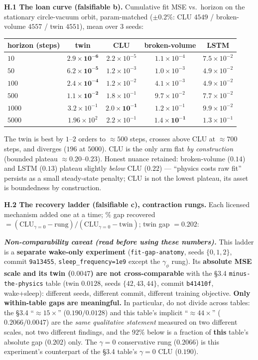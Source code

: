 \documentclass[10pt]{article}
\begin{document}
\textbf{H.1 The loan curve (falsifiable b).} Cumulative fit MSE vs.\ horizon on the stationary circle-vacuum orbit, param-matched ($\pm0.2\%$: CLU $4549$ / broken-volume $4557$ / twin $4551$), mean over $3$ seeds:
\begin{center}\small
\begin{tabular}{lcccc}
\toprule
horizon (steps) & \textbf{twin} & \textbf{CLU} & broken-volume & LSTM \\
\midrule
$10$ & $\mathbf{2.9{\times}10^{-6}}$ & $2.2{\times}10^{-5}$ & $1.1{\times}10^{-4}$ & $7.5{\times}10^{-2}$ \\
$50$ & $\mathbf{6.2{\times}10^{-5}}$ & $1.2{\times}10^{-3}$ & $1.0{\times}10^{-3}$ & $4.9{\times}10^{-2}$ \\
$100$ & $\mathbf{2.4{\times}10^{-4}}$ & $1.2{\times}10^{-2}$ & $4.1{\times}10^{-3}$ & $4.9{\times}10^{-2}$ \\
$500$ & $\mathbf{1.1{\times}10^{-2}}$ & $1.8{\times}10^{-1}$ & $9.7{\times}10^{-2}$ & $7.7{\times}10^{-2}$ \\
$1000$ & $3.2{\times}10^{-1}$ & $\mathbf{2.0{\times}10^{-1}}$ & $1.2{\times}10^{-1}$ & $9.9{\times}10^{-2}$ \\
$5000$ & $1.96{\times}10^{2}$ & $2.2{\times}10^{-1}$ & $\mathbf{1.4{\times}10^{-1}}$ & $1.3{\times}10^{-1}$ \\
\bottomrule
\end{tabular}
\end{center}
The twin is best by $1$--$2$ orders to $\approx500$ steps, crosses above CLU at $\approx700$ steps, and diverges ($196$ at $5000$). CLU is the only arm flat \emph{by construction} (bounded plateau $\approx0.20$--$0.23$). Honest nuance retained: broken-volume ($0.14$) and LSTM ($0.13$) plateau slightly \emph{below} CLU ($0.22$) --- ``physics costs raw fit'' persists as a small steady-state penalty; CLU is not the lowest plateau, its asset is boundedness by construction.

\textbf{H.2 The recovery ladder (falsifiable c), contraction rungs.} Each licensed mechanism added one at a time; $\%$ gap recovered $=(\mathrm{CLU}_{\gamma=0}-\mathrm{rung})/(\mathrm{CLU}_{\gamma=0}-\mathrm{twin})$; twin gap $=0.202$:

\emph{\textbf{Non-comparability caveat (read before using these numbers).}} This ladder is a \textbf{separate wake-only experiment} (\texttt{fit-gap-anatomy}, seeds $\{0,1,2\}$, commit \texttt{9a13455}, \texttt{sleep\_frequency=1e9} except the $\gamma_\phi$ rung). Its \textbf{absolute MSE scale and its twin ($0.0047$) are not cross-comparable} with the \S3.4 \texttt{minus-the-physics} table (twin $0.0128$, seeds $\{42,43,44\}$, commit \texttt{b41410f}, wake+sleep): different seeds, different commit, different training objective. \textbf{Only within-table gaps are meaningful.} In particular, do not divide across tables: the \S3.4 ``$\approx15\times$'' ($0.190/0.0128$) and this table's implicit ``$\approx44\times$'' ($0.2066/0.0047$) are the \emph{same qualitative statement} measured on two different scales, not two different findings, and the $92\%$ below is a fraction of \textbf{this} table's absolute gap ($0.202$) only. The $\gamma=0$ conservative rung ($0.2066$) is this experiment's counterpart of the \S3.4 table's $\gamma=0$ CLU ($0.190$).
\end{document}
